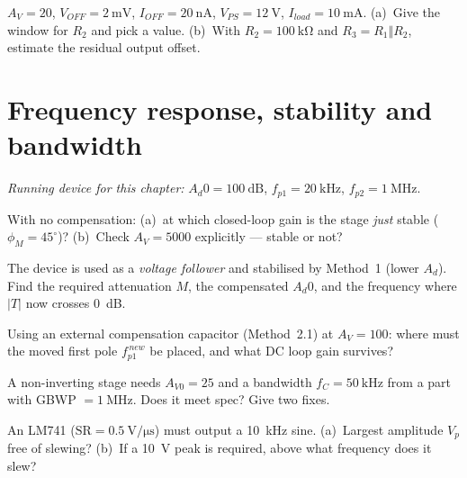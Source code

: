 \documentclass[11pt,a4paper,oneside]{book}
\newcommand{\Ad}{A_d}
\begin{document}
\begin{exercise}
$A_V=20$, $V_{\!OFF}=\qty{2}{\milli\volt}$, $I_{\!OFF}=\qty{20}{\nano\ampere}$,
$V_{PS}=\qty{12}{\volt}$, $I_{load}=\qty{10}{\milli\ampere}$.
(a)~Give the window for $R_2$ and pick a value.
(b)~With $R_2=\qty{100}{\kilo\ohm}$ and $R_3=R_1\Vert R_2$, estimate the residual
output offset.
\end{exercise}

\chapter{Frequency response, stability and bandwidth}

\noindent\textit{Running device for this chapter:} $\Ad0=\qty{100}{\dB}$,
$f_{p1}=\qty{20}{\kilo\hertz}$, $f_{p2}=\qty{1}{\mega\hertz}$.

\begin{exercise}
With no compensation: (a)~at which closed-loop gain is the stage \emph{just}
stable ($\phi_M=45^\circ$)? (b)~Check $A_V=5000$ explicitly --- stable or not?
\end{exercise}

\begin{exercise}
The device is used as a \emph{voltage follower} and stabilised by Method~1
(lower $\Ad$). Find the required attenuation $M$, the compensated $\Ad0$, and the
frequency where $|T|$ now crosses \qty{0}{\dB}.
\end{exercise}

\begin{exercise}[Method 2.1 at $A_V=100$]
Using an external compensation capacitor (Method~2.1) at $A_V=100$: where must the
moved first pole $f_{p1}^{\,new}$ be placed, and what DC loop gain survives?
\end{exercise}

\begin{exercise}
A non-inverting stage needs $A_{V0}=25$ and a bandwidth $f_C=\qty{50}{\kilo\hertz}$
from a part with GBWP $=\qty{1}{\mega\hertz}$. Does it meet spec? Give two fixes.
\end{exercise}

\begin{exercise}
An LM741 ($\text{SR}=\qty{0.5}{\volt\per\micro\second}$) must output a
\qty{10}{\kilo\hertz} sine. (a)~Largest amplitude $V_p$ free of slewing?
(b)~If a \qty{10}{\volt} peak is required, above what frequency does it slew?
\end{exercise}
\end{document}
